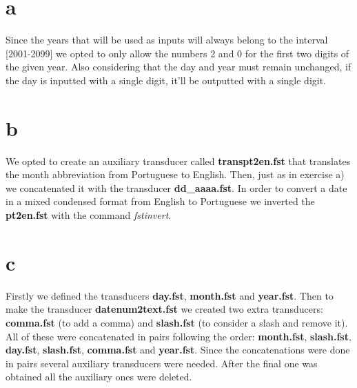 \documentclass[12pt]{article}
\begin{document}


\pagestyle{fancy}
\fancyhf{}
\rfoot{\thepage}

\thispagestyle{empty}
\renewcommand\thepage{}

\renewcommand\thepage{}
\setcounter{page}{1}
\renewcommand\thepage{\arabic{page}}
\pagestyle{fancy}

\rfoot{\thepage}

\section*{a}
\vspace{-5mm}
Since the years that will be used as inputs will always belong to the interval [2001-2099] we opted to only allow the numbers 2 and 0 for the first two digits of the given year. Also considering that the day and year must remain unchanged, if the day is inputted with a single digit, it'll be outputted with a single digit. 

\vspace{-5mm}
\section*{b}
\vspace{-5mm}
\par We opted to create an auxiliary transducer called \textbf{transpt2en.fst} that translates the month abbreviation from Portuguese to English. Then, just as in exercise a) we concatenated it with the transducer \textbf{dd\_aaaa.fst}. In order to convert a date in a mixed condensed format from English to Portuguese we inverted the \textbf{pt2en.fst} with the command \textit{fstinvert}.


\vspace{-5mm}
\section*{c}
\vspace{-5mm}
Firstly we defined the transducers \textbf{day.fst}, \textbf{month.fst} and \textbf{year.fst}. Then to make the transducer \textbf{datenum2text.fst} we created two extra transducers: \textbf{comma.fst} (to add a comma) and \textbf{slash.fst} (to consider a slash and remove it). All of these were concatenated in pairs following the order: \textbf{month.fst}, \textbf{slash.fst}, \textbf{day.fst}, \textbf{slash.fst}, \textbf{comma.fst} and \textbf{year.fst}. Since the concatenations were done in pairs several auxiliary transducers were needed. After the final one was obtained all the auxiliary ones were deleted.
\end{document}
